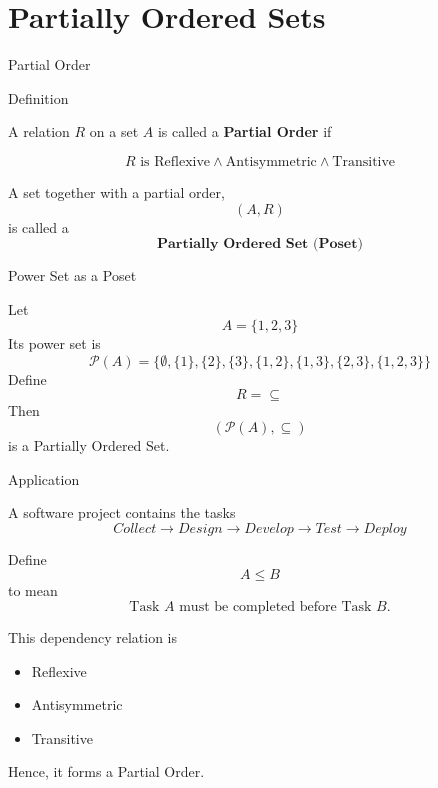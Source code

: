 
\section{Partially Ordered Sets}


\begin{frame}{Partial Order}

\begin{block}{Definition}

\vspace{0.1cm}

A relation $R$ on a set $A$ is called a \textbf{Partial Order} if

\[
R
\text{ is }
\boxed{\text{Reflexive}}
\land
\boxed{\text{Antisymmetric}}
\land
\boxed{\text{Transitive}}
\]

\end{block}

\vspace{0.3cm}

A set together with a partial order,
\[
(A,R)
\]
is called a
\[
\boxed{\textbf{Partially Ordered Set (Poset)}}
\]

\end{frame}


\begin{frame}{Power Set as a Poset}

Let
\[
A=\{1,2,3\}
\]
Its power set is
\[
\mathcal P(A)
=
\{
\emptyset,
\{1\},
\{2\},
\{3\},
\{1,2\},
\{1,3\},
\{2,3\},
\{1,2,3\}
\}
\]
Define
\[
R=\subseteq
\]
Then
\[
(\mathcal P(A),\subseteq)
\]
is a Partially Ordered Set.

\end{frame}


\begin{frame}{Application}

A software project contains the tasks
\[
Collect
\rightarrow
Design
\rightarrow
Develop
\rightarrow
Test
\rightarrow
Deploy
\]

Define
\[
A\le B
\]
to mean
\[
\text{Task }A
\text{ must be completed before Task }B.
\]

This dependency relation is
\begin{itemize}
\item Reflexive
\item Antisymmetric
\item Transitive
\end{itemize}
Hence, it forms a Partial Order.

\end{frame}